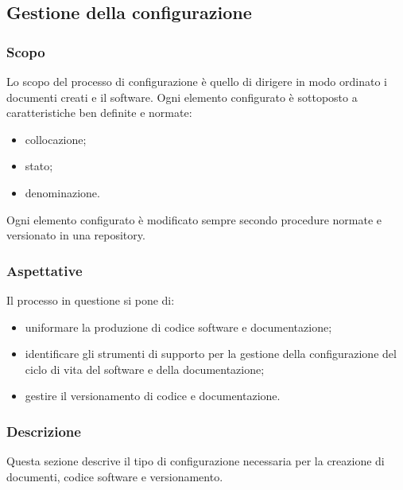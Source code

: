 \subsection{Gestione della configurazione}\label{3.2}

\subsubsection{Scopo}\label{3.2.1}
Lo scopo del processo di configurazione è quello di dirigere in modo ordinato i documenti creati e il software. Ogni elemento configurato è sottoposto a caratteristiche ben definite e normate:
\begin{itemize}
 \item collocazione;
 \item stato;
 \item denominazione.
\end{itemize}
Ogni elemento configurato è modificato sempre secondo procedure normate e versionato in una repository.

\subsubsection{Aspettative}
Il processo in questione si pone di:
\begin{itemize}
\item uniformare la produzione di codice software e documentazione;
\item identificare gli strumenti di supporto per la gestione della configurazione del ciclo di vita del software e della documentazione;
\item gestire il versionamento di codice e documentazione.
\end{itemize}


\subsubsection{Descrizione}
Questa sezione descrive il tipo di configurazione necessaria per la creazione di documenti, codice software e versionamento.



